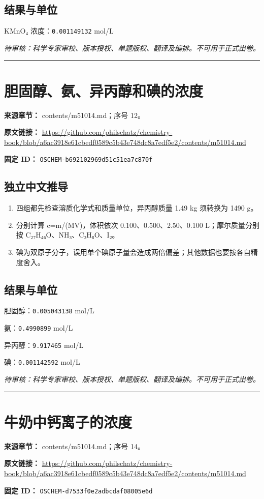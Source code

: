 \documentclass[UTF8,11pt,oneside,openany,fontset=none]{ctexbook}
\begin{document}
\subsection*{结果与单位}
\noindent KMnO₄ 浓度：\texttt{0.001149132} mol/L\par
\noindent\textit{待审核：科学专家审校、版本授权、单题版权、翻译及编排。不可用于正式出卷。}
\medskip\hrule\medskip
\section{胆固醇、氨、异丙醇和碘的浓度}
\noindent\textbf{来源章节：} contents/m51014.md；序号 12。\par
\noindent\textbf{原文链接：} \url{https://github.com/philschatz/chemistry-book/blob/a6ac3918e61cbedf0589c5b43e748dc8a7edf5e2/contents/m51014.md}\par
\noindent\textbf{固定 ID：} \texttt{OSCHEM-b692102969d51c51ea7c870f}\par
\subsection*{独立中文推导}
\begin{enumerate}
\item 四组都先检查溶质化学式和质量单位，异丙醇质量 1.49 kg 须转换为 1490 g。
\item 分别计算 c=m/(MV)，体积依次 0.100、0.500、2.50、0.100 L；摩尔质量分别按 C₂₇H₄₆O、NH₃、C₃H₈O、I₂。
\item 碘为双原子分子，误用单个碘原子量会造成两倍偏差；其他数据也要按各自精度舍入。
\end{enumerate}
\subsection*{结果与单位}
\noindent 胆固醇：\texttt{0.005043138} mol/L\par
\noindent 氨：\texttt{0.4990899} mol/L\par
\noindent 异丙醇：\texttt{9.917465} mol/L\par
\noindent 碘：\texttt{0.001142592} mol/L\par
\noindent\textit{待审核：科学专家审校、版本授权、单题版权、翻译及编排。不可用于正式出卷。}
\medskip\hrule\medskip
\section{牛奶中钙离子的浓度}
\noindent\textbf{来源章节：} contents/m51014.md；序号 14。\par
\noindent\textbf{原文链接：} \url{https://github.com/philschatz/chemistry-book/blob/a6ac3918e61cbedf0589c5b43e748dc8a7edf5e2/contents/m51014.md}\par
\noindent\textbf{固定 ID：} \texttt{OSCHEM-d7533f0e2adbcdaf08005e6d}\par
\end{document}
